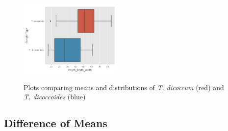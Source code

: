 \documentclass[11pt]{report}
\begin{document}
\begin{figure}[!ht]
{    \includegraphics[width=0.45\textwidth]{./images/results/group2/length_depth_width.png}
    }
  \caption{Plots comparing means and distributions of \textit{T. dicoccum} (red) and \textit{T. dicoccoides} (blue)}
  \label{fig:dummy}
\end{figure}
\clearpage
\subsection{Difference of Means}
\label{sec:org3860cd8}
\end{document}
